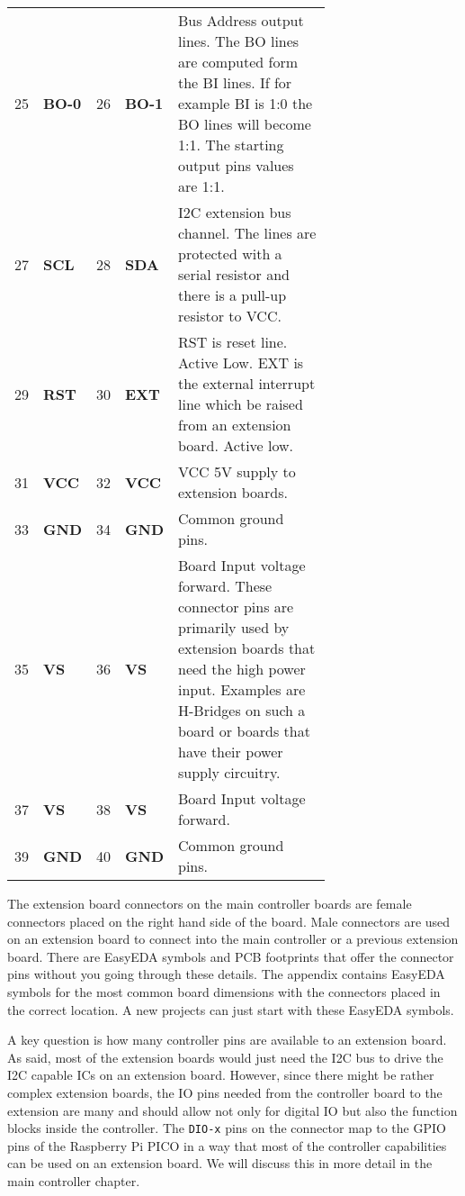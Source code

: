 \begin{longtable}{@{}|l|p{0.1\linewidth}|l|p{0.1\linewidth}|p{0.5\linewidth}@{}}
    \midrule
    25 & \textbf{BO-0} & 26 & \textbf{BO-1} & Bus Address output lines. The BO lines are computed form the BI lines. If for example BI is 1:0 the BO lines will become 1:1. The starting output pins values are 1:1. \\ 
    27 & \textbf{SCL} &  28 & \textbf{SDA} & I2C extension bus channel.  The lines are protected with a serial resistor and there is a pull-up resistor to VCC. \\
    \midrule
    29 & \textbf{RST} & 30 & \textbf{EXT} & RST is reset line. Active Low. EXT is the external interrupt line which be raised from an extension board. Active low. \\
    \midrule
    31 & \textbf{VCC} & 32 & \textbf{VCC} & VCC 5V supply to extension boards. \\
    \midrule
    33 & \textbf{GND} & 34 & \textbf{GND} & Common ground pins. \\
    \midrule
    35 & \textbf{VS} & 36 & \textbf{VS} & Board Input voltage forward. These connector pins are primarily used by extension boards that need the high power input. Examples are H-Bridges on such a board or boards that have their power supply circuitry. \\
    \midrule
    37 & \textbf{VS} & 38 & \textbf{VS} & Board Input voltage forward. \\
    \midrule
    39 & \textbf{GND} & 40 & \textbf{GND} & Common ground pins. \\
    \midrule
\end{longtable}  

The extension board connectors on the main controller boards are female connectors placed on the right hand side of the board. Male connectors are used on an extension board to connect into the main controller or a previous extension board. There are EasyEDA symbols and PCB footprints that offer the connector pins without you going through these details. The appendix contains EasyEDA symbols for the most common board dimensions with the connectors placed in the correct location. A new projects can just start with these EasyEDA symbols.

A key question is how many controller pins are available to an extension board. As said, most of the extension boards would just need the I2C bus to drive the I2C capable ICs on an extension board. However, since there might be rather complex extension boards, the IO pins needed from the controller board to the extension are many and should allow not only for digital IO but also the function blocks inside the controller. The \texttt{DIO-x} pins on the connector map to the GPIO pins of the Raspberry Pi PICO in a way that most of the controller capabilities can be used on an extension board. We will discuss this in more detail in the main controller chapter.


